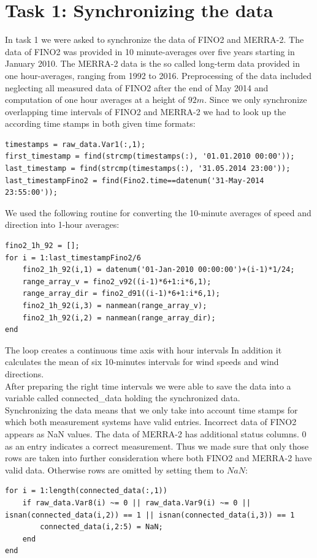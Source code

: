 \documentclass[10pt]{article}
\begin{document}
\section{Task 1: Synchronizing the data}
In task 1 we were asked to synchronize the data of FINO2 and MERRA-2. The data of FINO2 was provided in 10 minute-averages over five years starting in January 2010. The MERRA-2 data is the so called long-term data provided in one hour-averages, ranging from 1992 to 2016.
Preprocessing of the data included neglecting all measured data of FINO2 after the end of May 2014 and computation of one hour averages at a height of $92m$.
Since we only synchronize overlapping time intervals of FINO2 and MERRA-2 we had to look up the according time stamps in both given time formats: 
\begin{lstlisting}
timestamps = raw_data.Var1(:,1);
first_timestamp = find(strcmp(timestamps(:), '01.01.2010 00:00'));
last_timestamp = find(strcmp(timestamps(:), '31.05.2014 23:00'));
last_timestampFino2 = find(Fino2.time==datenum('31-May-2014 23:55:00'));
\end{lstlisting}
We used the following routine for converting the 10-minute averages of speed and direction into 1-hour averages:
\begin{lstlisting}
fino2_1h_92 = [];
for i = 1:last_timestampFino2/6
    fino2_1h_92(i,1) = datenum('01-Jan-2010 00:00:00')+(i-1)*1/24;
    range_array_v = fino2_v92((i-1)*6+1:i*6,1);
    range_array_dir = fino2_d91((i-1)*6+1:i*6,1);
    fino2_1h_92(i,3) = nanmean(range_array_v);
    fino2_1h_92(i,2) = nanmean(range_array_dir);
end
\end{lstlisting}
The loop creates a continuous time axis with hour intervals  In addition it calculates the mean of six 10-minutes intervals for wind speeds and wind directions.\\

After preparing the right time intervals we were able to save the data into a variable called connected\_data holding the synchronized data. \\
Synchronizing the data means that we only take into account time stamps for which both measurement systems have valid entries. Incorrect data of FINO2 appears as NaN values. The data of MERRA-2 has additional status columns. $0$ as an entry indicates a correct measurement. Thus we made sure that only those rows are taken into further consideration where both FINO2 and MERRA-2 have valid data. Otherwise rows are omitted by setting them to $NaN$:
\begin{lstlisting}
for i = 1:length(connected_data(:,1))
    if raw_data.Var8(i) ~= 0 || raw_data.Var9(i) ~= 0 || isnan(connected_data(i,2)) == 1 || isnan(connected_data(i,3)) == 1
        connected_data(i,2:5) = NaN;
    end
end
\end{lstlisting}
\end{document}
